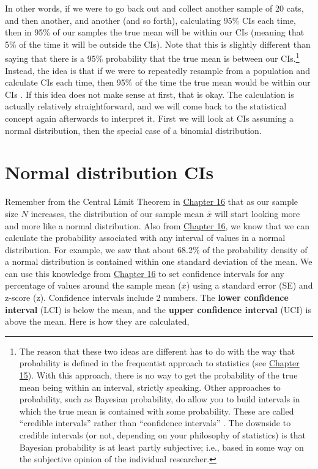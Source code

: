 \documentclass[
  openany]{scrbook}
\begin{document}
In other words, if we were to go back out and collect another sample of 20 cats, and then another, and another (and so forth), calculating 95\% CIs each time, then in 95\% of our samples the true mean will be within our CIs (meaning that 5\% of the time it will be outside the CIs).
Note that this is slightly different than saying that there is a 95\% probability that the true mean is between our CIs.\footnote{The reason that these two ideas are different has to do with the way that probability is defined in the frequentist approach to statistics (see \protect\hyperlink{Chapter_15}{Chapter 15}). With this approach, there is no way to get the probability of the true mean being within an interval, strictly speaking. Other approaches to probability, such as Bayesian probability, do allow you to build intervals in which the true mean is contained with some probability. These are called ``credible intervals'' rather than ``confidence intervals'' \citep[e.g.,][]{Ellison2004}. The downside to credible intervals (or not, depending on your philosophy of statistics) is that Bayesian probability is at least partly subjective; i.e., based in some way on the subjective opinion of the individual researcher.}
Instead, the idea is that if we were to repeatedly resample from a population and calculate CIs each time, then 95\% of the time the true mean would be within our CIs \citep{Sokal1995}.
If this idea does not make sense at first, that is okay.
The calculation is actually relatively straightforward, and we will come back to the statistical concept again afterwards to interpret it.
First we will look at CIs assuming a normal distribution, then the special case of a binomial distribution.

\hypertarget{normal-distribution-cis}{%
\section{Normal distribution CIs}\label{normal-distribution-cis}}

Remember from the Central Limit Theorem in \protect\hyperlink{Chapter_16}{Chapter 16} that as our sample size \(N\) increases, the distribution of our sample mean \(\bar{x}\) will start looking more and more like a normal distribution.
Also from \protect\hyperlink{Chapter_16}{Chapter 16}, we know that we can calculate the probability associated with any interval of values in a normal distribution.
For example, we saw that about 68.2\% of the probability density of a normal distribution is contained within one standard deviation of the mean.
We can use this knowledge from \protect\hyperlink{Chapter_16}{Chapter 16} to set confidence intervals for any percentage of values around the sample mean (\(\bar{x}\)) using a standard error (SE) and z-score (z).
Confidence intervals include 2 numbers.
The \textbf{lower confidence interval} (LCI) is below the mean, and the \textbf{upper confidence interval} (UCI) is above the mean.
Here is how they are calculated,
\end{document}
